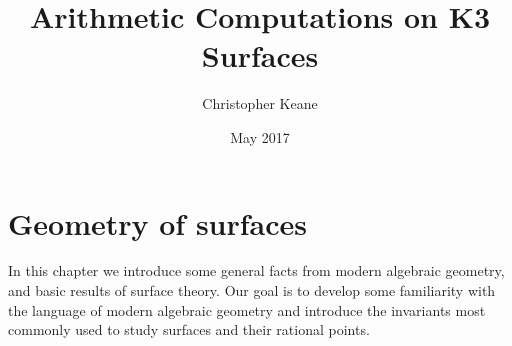\documentclass[12pt,twoside]{reedthesis}
\title{Arithmetic Computations on K3 Surfaces}
\author{Christopher Keane}
\date{May 2017}
\theoremstyle{plain}
\theoremstyle{definition}
\theoremstyle{remark}
\begin{document}

	


\chapter{Geometry of surfaces}
In this chapter we introduce some general facts from modern algebraic geometry, and basic results of surface theory. Our goal is to develop some familiarity with the language of modern algebraic geometry and introduce the invariants most commonly used to study surfaces and their rational points.
\end{document}
